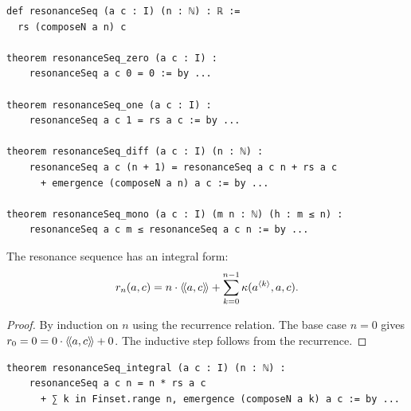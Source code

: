 \begin{lstlisting}[caption={Resonance sequence (IDT\_v3\_Emergence.lean)}]
def resonanceSeq (a c : I) (n : ℕ) : ℝ :=
  rs (composeN a n) c

theorem resonanceSeq_zero (a c : I) :
    resonanceSeq a c 0 = 0 := by ...

theorem resonanceSeq_one (a c : I) :
    resonanceSeq a c 1 = rs a c := by ...

theorem resonanceSeq_diff (a c : I) (n : ℕ) :
    resonanceSeq a c (n + 1) = resonanceSeq a c n + rs a c
      + emergence (composeN a n) a c := by ...

theorem resonanceSeq_mono (a c : I) (m n : ℕ) (h : m ≤ n) :
    resonanceSeq a c m ≤ resonanceSeq a c n := by ...
\end{lstlisting}

\begin{theorem}
\label{thm:resonance-seq-integral}
The resonance sequence has an integral form:
\[
  r_n(a,c) = n \cdot \langle\!\langle a, c \rangle\!\rangle + \sum_{k=0}^{n-1} \kappa(a^{\langle k \rangle}, a, c).
\]
\end{theorem}

\begin{proof}
By induction on $n$ using the recurrence relation. The base case $n=0$ gives
$r_0 = 0 = 0 \cdot \langle\!\langle a, c \rangle\!\rangle + 0$. The inductive step follows from the
recurrence.
\end{proof}

\begin{lstlisting}[caption={Resonance integral (IDT\_v3\_Emergence.lean)}]
theorem resonanceSeq_integral (a c : I) (n : ℕ) :
    resonanceSeq a c n = n * rs a c
      + ∑ k in Finset.range n, emergence (composeN a k) a c := by ...
\end{lstlisting}

